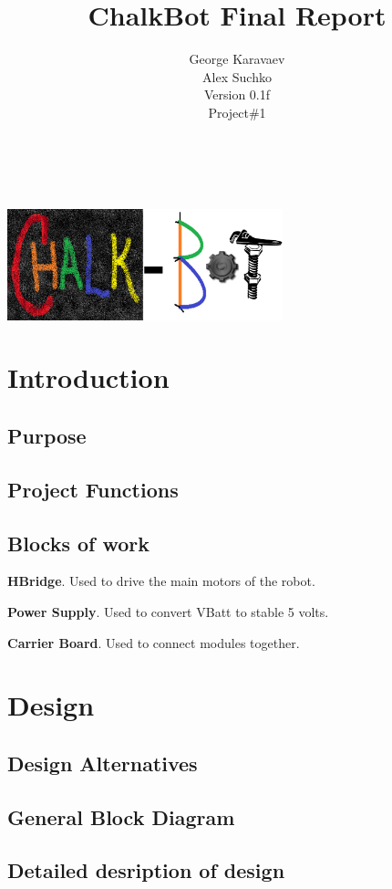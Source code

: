 \documentclass[12pt]{article}
\title{ChalkBot Final Report}
\author{George Karavaev\\Alex Suchko\\ \normalsize Version 0.1f \\Project\#1}
\begin{document}
  \maketitle 
\\
\\
{\centering
\includegraphics[width=0.6\textwidth]{../chalk_bot_logo2.png}
}
\newpage
 \tableofcontents
\listoffigures
\newpage
 \section{Introduction}
 \subsection{Purpose}
\subsection{Project Functions}
\subsection{Blocks of work}
 \begin{description}
  \item{\bf HBridge}. Used to drive the main motors of the robot. 
  \item{\bf Power Supply}. Used to convert VBatt to stable 5 volts.
  \item{\bf Carrier Board}. Used to connect modules together.
\end{description}

\section{Design}
\subsection{Design Alternatives}
\subsection{General Block Diagram}
\subsection{Detailed desription of design}
\end{document}
